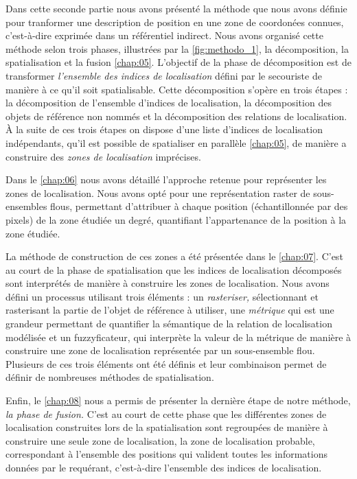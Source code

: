 Dans cette seconde partie nous avons présenté la méthode que nous
avons définie pour tranformer une description de position en une zone
de coordonées connues, c'est-à-dire exprimée dans un référentiel
indirect. Nous avons organisé cette méthode selon trois phases,
illustrées par la \autoref{fig:methodo_1}, la décomposition, la
spatialisation et la fusion \autoref{chap:05}. L'objectif de la phase
de décomposition est de transformer \emph{l'ensemble des indices de
  localisation} défini par le secouriste de manière à ce qu'il soit
spatialisable. Cette décomposition s'opère en trois étapes : la
décomposition de l'ensemble d'indices de localisation, la
décomposition des objets de référence non nommés et la décomposition
des relations de localisation. À la suite de ces trois étapes on
dispose d'une liste d'indices de localisation indépendants, qu'il est
possible de spatialiser en parallèle \autoref{chap:05}, de manière a
construire des \emph{zones de localisation} imprécises.

Dans le \autoref{chap:06} nous avons détaillé l'approche retenue pour
représenter les zones de localisation. Nous avons opté pour une
représentation raster de sous-ensembles flous, permettant d'attribuer
à chaque position (échantillonnée par des pixels) de la zone étudiée
un degré, quantifiant l'appartenance de la position à la zone
étudiée.

La méthode de construction de ces zones a été présentée dans le
\autoref{chap:07}. C'est au court de la phase de spatialisation que
les indices de localisation décomposés sont interprétés de manière à
construire les zones de localisation. Nous avons défini un processus
utilisant trois éléments : un \emph{rasteriser,} sélectionnant et
rasterisant la partie de l'objet de référence à utiliser, une
\emph{métrique} qui est une grandeur permettant de quantifier la
sémantique de la relation de localisation modélisée et un
fuzzyficateur, qui interprète la valeur de la métrique de manière à
construire une zone de localisation représentée par un sous-ensemble
flou. Plusieurs de ces trois éléments ont été définis et leur
combinaison permet de définir de nombreuses méthodes de
spatialisation.

Enfin, le \autoref{chap:08} nous a permis de présenter la dernière
étape de notre méthode, \emph{la phase de fusion.} C'est au court de
cette phase que les différentes zones de localisation construites lors
de la spatialisation sont regroupées de manière à construire une seule
zone de localisation, la zone de localisation probable, correspondant
à l'ensemble des positions qui valident toutes les informations
données par le requérant, c'est-à-dire l'ensemble des indices de
localisation.

